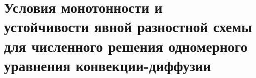 \documentclass[__main__.tex]{subfiles}
\begin{document}
\section{Условия монотонности и устойчивости явной разностной схемы для численного решения одномерного уравнения конвекции-диффузии}
\end{document}
